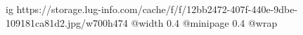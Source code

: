  
 
 
 
 

\ifcmt
  ig https://storage.lug-info.com/cache/f/f/12bb2472-407f-440e-9dbe-109181ca81d2.jpg/w700h474%
  @width 0.4
  @minipage 0.4
  @wrap \parpic[r]
\fi
